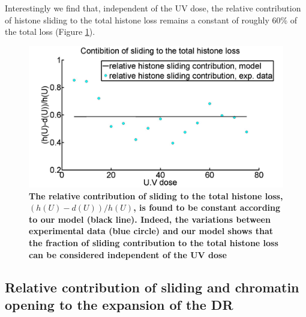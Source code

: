 \documentclass[12pt]{article}
\begin{document}
Interestingly we find that, independent of the UV dose, the relative contribution of histone sliding to the total histone loss remains a constant of roughly 60\% of the total loss (Figure \ref{fig:relativeSlidingContribution}). 

\begin{figure}[H]
\centering
\includegraphics[width=0.5\linewidth, height=0.3\textheight]{relativeSlidingContribution}
\caption{\textbf{The relative contribution of sliding to the total histone loss, $(h(U)-d(U))/h(U)$, is found to be constant according to our model (black line). Indeed, the variations between experimental data (blue circle) and our model shows that the fraction of sliding contribution to the total histone loss can be considered independent of the UV dose}}
\label{fig:relativeSlidingContribution}
\end{figure}

\subsection{Relative contribution of sliding and chromatin opening to the expansion of the DR}\label{subsection:RelativecontibutionOfSlidingAndOpeningToExpansion}
\end{document}
